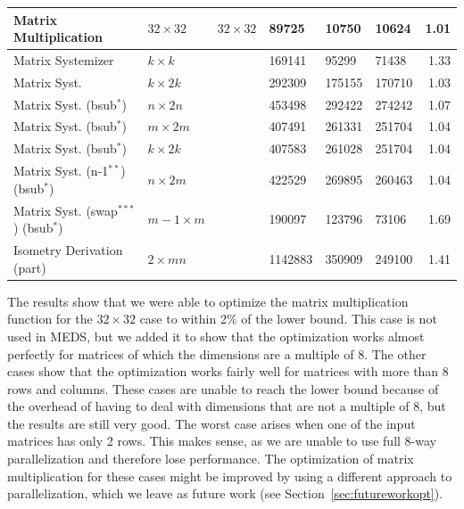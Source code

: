 \documentclass[11pt,a4paper]{report}
\theoremstyle{definition}
\begin{document}
\begin{table}
{\begin{tabular}{lllR{1.35cm}R{1.2cm}R{1.2cm}r}
      Matrix Multiplication                    & $32 \times 32$                          & $32 \times 32$                 & 89725           & 10750          & 10624          & 1.01 \\
      \midrule
      Matrix Systemizer                        & $k \times k$                            &                                & 169141          & 95299          & 71438          & 1.33 \\
      Matrix Syst.                             & $k \times 2k$                           &                                & 292309          & 175155         & 170710         & 1.03 \\
      Matrix Syst. (bsub$^{*}$)                & $n \times 2n$                           &                                & 453498          & 292422         & 274242         & 1.07 \\
      Matrix Syst. (bsub$^{*}$)                & $m \times 2m$                           &                                & 407491          & 261331         & 251704         & 1.04 \\
      Matrix Syst. (bsub$^{*}$)                & $k \times 2k$                           &                                & 407583          & 261028         & 251704         & 1.04 \\
      Matrix Syst. (n-1$^{**}$) (bsub$^{*}$)   & $n \times 2m$                           &                                & 422529          & 269895         & 260463         & 1.04 \\
      Matrix Syst. (swap$^{***}$) (bsub$^{*}$) & $m-1 \times m$                          &                                & 190097          & 123796         & 73106          & 1.69 \\
      \midrule
      Isometry Derivation (part)               & $2 \times mn$                           &                                & 1142883         & 350909         & 249100         & 1.41 \\
      \bottomrule
    \end{tabular}
  }
  \label{tab:lowleveloptimizationresults}
\end{table}

The results show that we were able to optimize the matrix multiplication function for the $32 \times 32$ case to within 2\% of the lower bound. This case is not used in MEDS, but we added it to show that the optimization works almost perfectly for matrices of which the dimensions are a multiple of 8. The other cases show that the optimization works fairly well for matrices with more than 8 rows and columns. These cases are unable to reach the lower bound because of the overhead of having to deal with dimensions that are not a multiple of 8, but the results are still very good. The worst case arises when one of the input matrices has only 2 rows. This makes sense, as we are unable to use full 8-way parallelization and therefore lose performance. The optimization of matrix multiplication for these cases might be improved by using a different approach to parallelization, which we leave as future work (see Section~\ref{sec:futureworkopt}).
\end{document}
